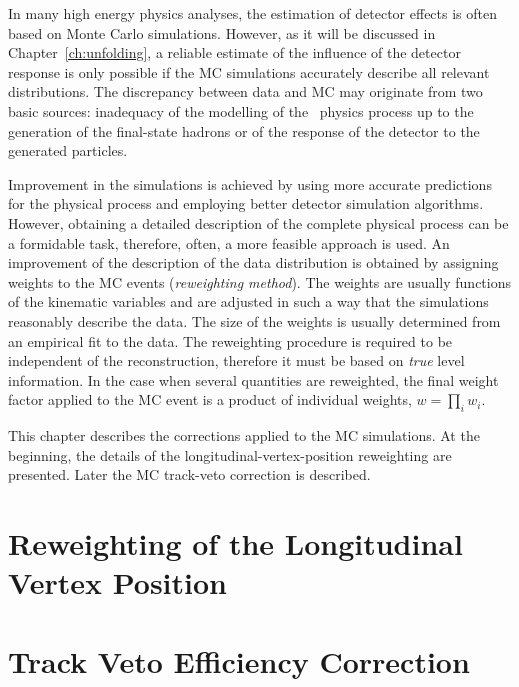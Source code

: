  In many high energy physics analyses, the estimation of detector effects is often based on Monte Carlo simulations. However, as it will be discussed in Chapter~\ref{ch:unfolding}, a reliable estimate of the influence of the detector response is only possible if the MC simulations accurately describe all relevant distributions. %
 The discrepancy between data and MC may originate from two basic sources: inadequacy of the modelling of the \ep~physics process up to the generation of the final-state hadrons or of the response of the detector to the generated particles.
 
Improvement in the simulations is achieved by using more accurate predictions for the physical process and employing better detector simulation algorithms. However, obtaining a detailed description of the complete physical process can be a formidable task, therefore, often, a more feasible approach is used. An improvement of the description of the data distribution is obtained by assigning weights to the MC events (\emph{reweighting method}). The weights are usually functions of the kinematic variables and are adjusted in such a way that the simulations reasonably describe the data. The size of the weights is usually determined from an empirical fit to the data. The reweighting procedure is required to be independent of the reconstruction, therefore it must be based on \emph{true} level information. In the case when several quantities are reweighted, the final weight factor applied to the MC event is a product of individual weights, $w = \prod_i w_i$.
 
 This chapter describes the corrections applied to the MC simulations. At the beginning, the details of the longitudinal-vertex-position reweighting are presented. Later the MC track-veto correction is described.

 \section{Reweighting of the Longitudinal Vertex Position}
 \label{sec:zvtxrew}
 
 
 \section{Track Veto Efficiency Correction}
 \label{sec:trkvetoeff}
 

